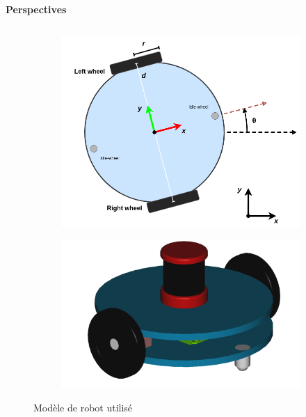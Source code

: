\documentclass[aspectratio=169,10pt]{beamer}
\begin{document}
\begin{frame}{\textbf{Perspectives}}
\begin{columns}[t]
        \begin{column}{0.45\textwidth}
			\begin{figure}[H]
				\centering
				\begin{subfigure}{0.45\textwidth}
					\centering
					\includegraphics[width=\textwidth]{IMAGES/robot_model_2.png}
				\end{subfigure}
				\hfill
				\begin{subfigure}{0.45\textwidth}
					\centering
					\includegraphics[width=\textwidth]{IMAGES/robot_3Dmodel.png}
				\end{subfigure}
				\caption{Modèle de robot utilisé}
			\end{figure}


\end{column}
\end{columns}
\end{frame}
\end{document}
